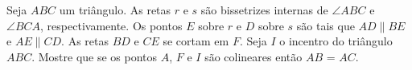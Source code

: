Seja $ABC$ um triângulo. As retas $r$ e $s$ são bissetrizes internas de $\angle ABC$ e $\angle BCA$,
respectivamente. Os pontos $E$ sobre $r$ e $D$ sobre $s$ são tais que $AD \parallel BE$ e $AE \parallel CD$. As retas $BD$ e $CE$ se cortam
em $F$. Seja $I$ o incentro do triângulo $ABC$. Mostre que se os pontos $A$, $F$ e $I$ são colineares então $AB$ = $AC$.
